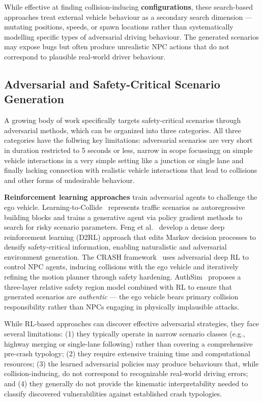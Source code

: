 While effective at finding collision-inducing \textbf{configurations}, these search-based approaches treat external vehicle behaviour as a secondary search dimension --- mutating positions, speeds, or spawn locations rather than systematically modelling specific types of adversarial driving behaviour. The generated scenarios may expose bugs but often produce unrealistic NPC actions that do not correspond to plausible real-world driver behaviour.

\subsection{Adversarial and Safety-Critical Scenario Generation}\label{sec:scenario_generation}

A growing body of work specifically targets safety-critical scenarios through adversarial methods, which can be organized into three categories.
All three categories have the follwing key limitations: adversarial scenarios are very short in duration restricted to 5 seconds or less, narrow in scope focussingg on simple vehicle interactions in a very simple setting like a junction or single lane and finally lacking connection with realistic vehicle interactions that lead to collisions and other forms of undesirable behaviour. 

\textbf{Reinforcement learning approaches} train adversarial agents to challenge the ego vehicle. Learning-to-Collide~\cite{ding_learning_2020} represents traffic scenarios as autoregressive building blocks and trains a generative agent via policy gradient methods to search for risky scenario parameters. Feng et al.~\cite{feng_dense_2023} develop a dense deep reinforcement learning (D2RL) approach that edits Markov decision processes to densify safety-critical information, enabling naturalistic and adversarial environment generation. The CRASH framework~\cite{kulkarni_crash_2024} uses adversarial deep RL to control NPC agents, inducing collisions with the ego vehicle and iteratively refining the motion planner through safety hardening. AuthSim~\cite{yang_authsim_2025} proposes a three-layer relative safety region model combined with RL to ensure that generated scenarios are \textit{authentic} --- the ego vehicle bears primary collision responsibility rather than NPCs engaging in physically implausible attacks.

While RL-based approaches can discover effective adversarial strategies, they face several limitations: (1) they typically operate in narrow scenario classes (e.g., highway merging or single-lane following) rather than covering a comprehensive pre-crash typology; (2) they require extensive training time and computational resources; (3) the learned adversarial policies may produce behaviours that, while collision-inducing, do not correspond to recognizable real-world driving errors; and (4) they generally do not provide the kinematic interpretability needed to classify discovered vulnerabilities against established crash typologies.

